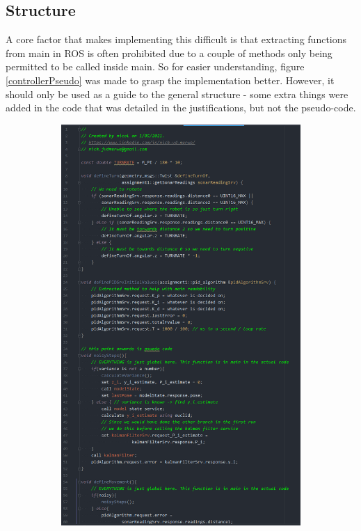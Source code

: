 \documentclass{article}
\begin{document}
\subsection{Structure}
A core factor that makes implementing this difficult is that extracting functions
from main in ROS is often prohibited due to a couple of methods only being
permitted to be called inside main. So for easier understanding, figure
\ref{controllerPseudo} was made to grasp the implementation better. However, it
should only be used as a guide to the general structure - some extra things were
added in the code that was detailed in the justifications, but not the pseudo-code.
\begin{figure}[ht]
    \begin{subfigure}{.5\textwidth}
        \centering
        \includegraphics[scale=0.22]{img/pseudocode_1.png}

\end{subfigure}
\end{figure}
\end{document}
